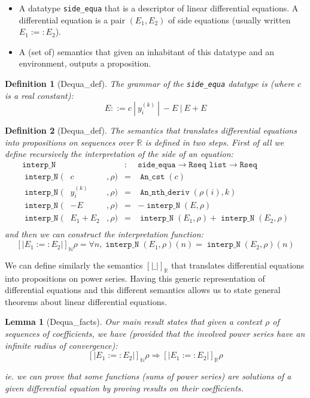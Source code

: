 \documentclass[submission,copyright]{eptcs}
\newcommand{\N}{\mathbb{N}}
\newcommand{\R}{\mathbb{R}}
\DeclareMathOperator{\C}{\mathtt{An\_cst}}
\DeclareMathOperator{\Dn}{\mathtt{An\_nth\_deriv}}
\DeclareMathOperator{\IN}{\mathtt{interp\_N}}
\newtheorem{definition}{Definition}
\newtheorem{lemma}{Lemma}
\begin{document}
\begin{itemize}
 \item A datatype \texttt{side\_equa} that is a descriptor of linear 
   differential equations. A differential equation is a pair $(E_1,E_2)$
	of side equations (usually written $E_1 :=: E_2$).
 
 \item A (set of) semantics that given an inhabitant of this datatype
	and an environment, outputs a proposition.
\end{itemize}

\begin{definition}[Dequa\_def] The grammar of the \texttt{side\_equa}
datatype is (where $c$ is a real constant):
$$E ::= c ~|~ y_i^{(k)} ~|~ - E ~|~ E + E$$\end{definition}


\begin{definition}[Dequa\_def] The semantics that translates differential
equations into propositions on sequences over $\R$ is defined in two steps.
First of all we define recursively the interpretation of the side
of an equation:$$\begin{array}{lclcl}
\IN{}& & & : & \texttt{side\_equa} \rightarrow \texttt{Rseq list}
 \rightarrow \texttt{Rseq} \\
\IN{}(& c &, \rho) & = & \C{}(c)\\
\IN{}(& y_i^{(k)} &, \rho) & = & \Dn{}(\rho(i),k) \\
\IN{}(& - E &, \rho) & = & - \IN{}(E,\rho)\\
\IN{}(& E_1 + E_2 &, \rho) & = & \IN{}(E_1,\rho) + \IN{}(E_2,\rho)\\
\end{array}$$
and then we can construct the interpretation function:
$$\left[\left| E_1 :=: E_2 \right|\right]_\N \rho = \forall n,
\IN{}(E_1,\rho)(n) = \IN{}(E_2,\rho)(n)$$\end{definition}

We can define similarly the semantics $\left[\left| \_ \right|\right]_\R$
that translates differential equations into propositions on power series.
Having this generic representation of differential equations and this
different semantics allows us to state general theorems about linear
differential equations.

\begin{lemma}[Dequa\_facts] Our main result states that given a context
$\rho$ of sequences of coefficients, we have (provided that the involved
power series have an infinite radius of convergence):
$$\left[\left| E_1 :=: E_2 \right|\right]_\N \rho \Rightarrow
\left[\left| E_1 :=: E_2 \right|\right]_\R \rho$$

ie. we can prove that some functions (sums of power series) are solutions
of a given differential equation by proving results on their coefficients.
\end{lemma}
\end{document}
